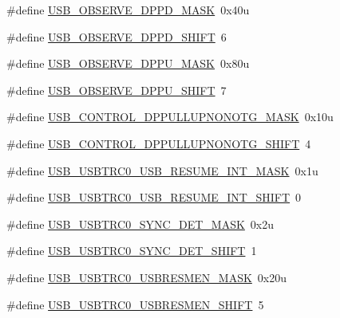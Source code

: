 \begin{DoxyCompactItemize}
\#define \hyperlink{group___u_s_b___register___masks_ga8368ad607c0f5a0ab499734e26f36aad}{U\+S\+B\+\_\+\+O\+B\+S\+E\+R\+V\+E\+\_\+\+D\+P\+P\+D\+\_\+\+M\+A\+SK}~0x40u
\item 
\#define \hyperlink{group___u_s_b___register___masks_gaba84f8caae5d942588bd678bbc2ad267}{U\+S\+B\+\_\+\+O\+B\+S\+E\+R\+V\+E\+\_\+\+D\+P\+P\+D\+\_\+\+S\+H\+I\+FT}~6
\item 
\#define \hyperlink{group___u_s_b___register___masks_ga04f8b1d77478cb027a79323cef482965}{U\+S\+B\+\_\+\+O\+B\+S\+E\+R\+V\+E\+\_\+\+D\+P\+P\+U\+\_\+\+M\+A\+SK}~0x80u
\item 
\#define \hyperlink{group___u_s_b___register___masks_ga08ff5b00473fda9eb458f3457490eb15}{U\+S\+B\+\_\+\+O\+B\+S\+E\+R\+V\+E\+\_\+\+D\+P\+P\+U\+\_\+\+S\+H\+I\+FT}~7
\item 
\#define \hyperlink{group___u_s_b___register___masks_ga764d9d972859eeded5e092a77eb4de79}{U\+S\+B\+\_\+\+C\+O\+N\+T\+R\+O\+L\+\_\+\+D\+P\+P\+U\+L\+L\+U\+P\+N\+O\+N\+O\+T\+G\+\_\+\+M\+A\+SK}~0x10u
\item 
\#define \hyperlink{group___u_s_b___register___masks_ga5bae9683a5ae7c48617b8d24a35786ce}{U\+S\+B\+\_\+\+C\+O\+N\+T\+R\+O\+L\+\_\+\+D\+P\+P\+U\+L\+L\+U\+P\+N\+O\+N\+O\+T\+G\+\_\+\+S\+H\+I\+FT}~4
\item 
\#define \hyperlink{group___u_s_b___register___masks_ga9c943cc95fdf52fa40311292f2801518}{U\+S\+B\+\_\+\+U\+S\+B\+T\+R\+C0\+\_\+\+U\+S\+B\+\_\+\+R\+E\+S\+U\+M\+E\+\_\+\+I\+N\+T\+\_\+\+M\+A\+SK}~0x1u
\item 
\#define \hyperlink{group___u_s_b___register___masks_ga48af1176ed5d811c299eb123f934425d}{U\+S\+B\+\_\+\+U\+S\+B\+T\+R\+C0\+\_\+\+U\+S\+B\+\_\+\+R\+E\+S\+U\+M\+E\+\_\+\+I\+N\+T\+\_\+\+S\+H\+I\+FT}~0
\item 
\#define \hyperlink{group___u_s_b___register___masks_ga2e2f3b4bb79885ed92d75c9f86d42e23}{U\+S\+B\+\_\+\+U\+S\+B\+T\+R\+C0\+\_\+\+S\+Y\+N\+C\+\_\+\+D\+E\+T\+\_\+\+M\+A\+SK}~0x2u
\item 
\#define \hyperlink{group___u_s_b___register___masks_ga986ea3386acad15ab845a8c5d9644c9e}{U\+S\+B\+\_\+\+U\+S\+B\+T\+R\+C0\+\_\+\+S\+Y\+N\+C\+\_\+\+D\+E\+T\+\_\+\+S\+H\+I\+FT}~1
\item 
\#define \hyperlink{group___u_s_b___register___masks_gaf236b1fdfa7f7dab54961c74538dfb75}{U\+S\+B\+\_\+\+U\+S\+B\+T\+R\+C0\+\_\+\+U\+S\+B\+R\+E\+S\+M\+E\+N\+\_\+\+M\+A\+SK}~0x20u
\item 
\#define \hyperlink{group___u_s_b___register___masks_ga4b62f293769f60cae99319d6bb1299e8}{U\+S\+B\+\_\+\+U\+S\+B\+T\+R\+C0\+\_\+\+U\+S\+B\+R\+E\+S\+M\+E\+N\+\_\+\+S\+H\+I\+FT}~5

\end{DoxyCompactItemize}
